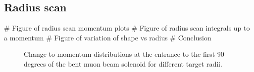 \subsection{Radius scan}
\begin{easylist}
	# Figure of radius scan momentum plots
	# Figure of radius scan integrals up to a momentum
	# Figure of variation of shape vs radius
	# Conclusion
\end{easylist}
\begin{figure}[t]
\centering
{}
\caption{
Change to momentum distributions at the entrance to the first 90 degrees of the bent muon beam solenoid for different target radii.
}
\label{optimisation:ProdTgtSec:Radius:Momentum}
\end{figure}

